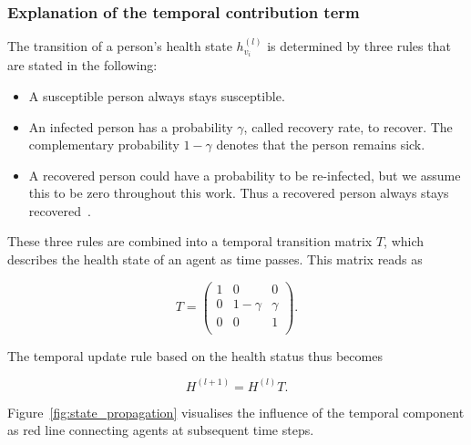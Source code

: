 \subsubsection{Explanation of the temporal contribution term}

The transition of a person's health state $h_{v_i}^{(l)}$ is determined by three rules that are stated in the following:

\begin{itemize}
	\item A susceptible person always stays susceptible.
	\item An infected person has a probability $\gamma$, called recovery rate, to recover. The complementary probability $1-\gamma$ denotes that the person remains sick.
	\item A recovered person could have a probability to be re-infected, but we assume this to be zero throughout this work. Thus a recovered person always stays recovered~\cite{Bao2020.03.13.990226}.
\end{itemize}

These three rules are combined into a temporal transition matrix $T$, which describes the health state of an agent as time passes. This matrix reads as

\begin{equation}
	T = 
	\begin{pmatrix}
		1 &     0    & 0      \\
		0 & 1-\gamma & \gamma \\
		0 &     0    & 1      \\
	\end{pmatrix}.
\end{equation}

The temporal update rule based on the health status thus becomes

\begin{equation}
	H^{(l+1)} = H^{(l)} T.
\end{equation}

Figure~\ref{fig:state_propagation} visualises the influence of the temporal component as red line connecting agents at subsequent time steps.